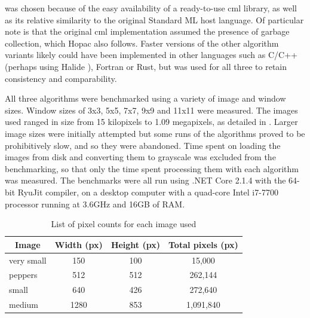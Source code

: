 \fsharp{} was chosen because of the easy availability of a ready-to-use \gls{cml} library, as well as its relative similarity to the original Standard ML host language.  Of particular note is that the original \gls{cml} implementation assumed the presence of garbage collection, which Hopac also follows.  Faster versions of the other algorithm variants likely could have been implemented in other languages such as C/C++ (perhaps using Halide \cite{Ragan-Kelley2017}), Fortran or Rust, but \fsharp{} was used for all three to retain consistency and comparability.  

All three algorithms were benchmarked using a variety of image and window sizes.  Window sizes of 3x3, 5x5, 7x7, 9x9 and 11x11 were measured.  The images used ranged in size from 15 kilopixels to 1.09 megapixels, as detailed in .  Larger image sizes were initially attempted but some runs of the algorithms proved to be prohibitively slow, and so they were abandoned.  Time spent on loading the images from disk and converting them to grayscale was excluded from the benchmarking, so that only the time spent processing them with each algorithm was measured.  The benchmarks were all run using .NET Core 2.1.4 with the 64-bit RyuJit compiler, on a desktop computer with a quad-core Intel i7-7700 processor running at 3.6GHz and 16GB of RAM.

\begin{table}
\centering
\caption{List of pixel counts for each image used}
\label{tab:median:pixelcounts}
\begin{tabular}{@{}lccc@{}}
\toprule
\multicolumn{1}{c}{\textbf{Image}} & \multicolumn{1}{c}{\textbf{Width (px)}} & \multicolumn{1}{c}{\textbf{Height (px)}} & \multicolumn{1}{c}{\textbf{Total pixels (px)}} \\ \midrule
very small                         & 150                                     & 100                                      & 15,000                                         \\
peppers                            & 512                                     & 512                                      & 262,144                                        \\
small                              & 640                                     & 426                                      & 272,640                                        \\
medium                             & 1280                                    & 853                                      & 1,091,840                                      \\ \bottomrule
\end{tabular}
\end{table}

